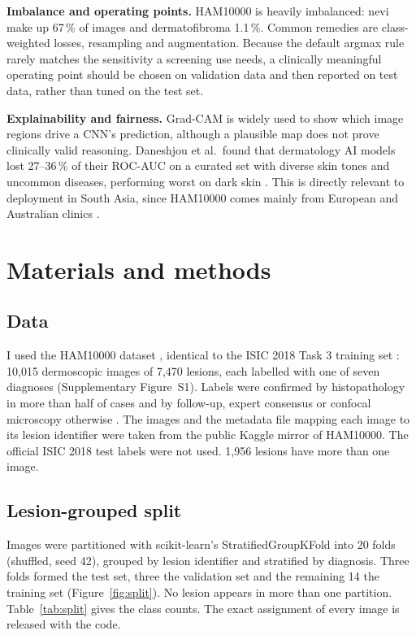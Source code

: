 \documentclass[11pt,a4paper]{article}
\newcommand{\pct}{\,\%}
\begin{document}
\textbf{Imbalance and operating points.} HAM10000 is heavily imbalanced: nevi make up 67\pct{} of images and dermatofibroma 1.1\pct. Common remedies are class-weighted losses, resampling and augmentation. Because the default argmax rule rarely matches the sensitivity a screening use needs, a clinically meaningful operating point should be chosen on validation data and then reported on test data, rather than tuned on the test set.

\textbf{Explainability and fairness.} Grad-CAM \cite{selvaraju2017} is widely used to show which image regions drive a CNN's prediction, although a plausible map does not prove clinically valid reasoning. Daneshjou et al.\ found that dermatology AI models lost 27--36\pct{} of their ROC-AUC on a curated set with diverse skin tones and uncommon diseases, performing worst on dark skin \cite{daneshjou2022}. This is directly relevant to deployment in South Asia, since HAM10000 comes mainly from European and Australian clinics \cite{tschandl2018}.

\section{Materials and methods}
\subsection{Data}
I used the HAM10000 dataset \cite{tschandl2018}, identical to the ISIC 2018 Task 3 training set \cite{codella2019}: 10,015 dermoscopic images of 7,470 lesions, each labelled with one of seven diagnoses (Supplementary Figure~S1). Labels were confirmed by histopathology in more than half of cases and by follow-up, expert consensus or confocal microscopy otherwise \cite{tschandl2018}. The images and the metadata file mapping each image to its lesion identifier were taken from the public Kaggle mirror of HAM10000. The official ISIC 2018 test labels were not used. 1,956 lesions have more than one image.

\subsection{Lesion-grouped split}
Images were partitioned with scikit-learn's StratifiedGroupKFold \cite{pedregosa2011} into 20 folds (shuffled, seed 42), grouped by lesion identifier and stratified by diagnosis. Three folds formed the test set, three the validation set and the remaining 14 the training set (Figure~\ref{fig:split}). No lesion appears in more than one partition. Table~\ref{tab:split} gives the class counts. The exact assignment of every image is released with the code.
\end{document}
